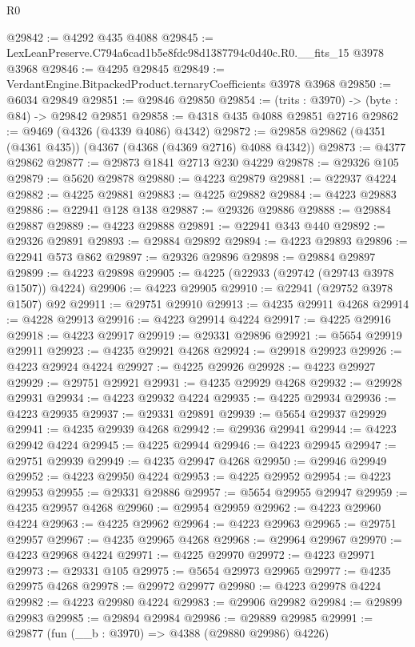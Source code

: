 \begin{lexlean}{R0}
\begin{coremodule}
@29842 := @4292 @435 @4088
@29845 := LexLeanPreserve.C794a6cad1b5e8fdc98d1387794c0d40c.R0.__fits_15 @3978 @3968
@29846 := @4295 @29845
@29849 := VerdantEngine.BitpackedProduct.ternaryCoefficients @3978 @3968
@29850 := @6034 @29849
@29851 := @29846 @29850
@29854 := (trits : @3970) -> (byte : @84) -> @29842 @29851
@29858 := @4318 @435 @4088 @29851 @2716
@29862 := @9469 (@4326 (@4339 @4086) @4342)
@29872 := @29858 @29862 (@4351 (@4361 @435)) (@4367 (@4368 (@4369 @2716) @4088 @4342))
@29873 := @4377 @29862
@29877 := @29873 @1841 @2713 @230 @4229
@29878 := @29326 @105
@29879 := @5620 @29878
@29880 := @4223 @29879
@29881 := @22937 @4224
@29882 := @4225 @29881
@29883 := @4225 @29882
@29884 := @4223 @29883
@29886 := @22941 @128 @138
@29887 := @29326 @29886
@29888 := @29884 @29887
@29889 := @4223 @29888
@29891 := @22941 @343 @440
@29892 := @29326 @29891
@29893 := @29884 @29892
@29894 := @4223 @29893
@29896 := @22941 @573 @862
@29897 := @29326 @29896
@29898 := @29884 @29897
@29899 := @4223 @29898
@29905 := @4225 (@22933 (@29742 (@29743 @3978 @1507)) @4224)
@29906 := @4223 @29905
@29910 := @22941 (@29752 @3978 @1507) @92
@29911 := @29751 @29910
@29913 := @4235 @29911 @4268
@29914 := @4228 @29913
@29916 := @4223 @29914 @4224
@29917 := @4225 @29916
@29918 := @4223 @29917
@29919 := @29331 @29896
@29921 := @5654 @29919 @29911
@29923 := @4235 @29921 @4268
@29924 := @29918 @29923
@29926 := @4223 @29924 @4224
@29927 := @4225 @29926
@29928 := @4223 @29927
@29929 := @29751 @29921
@29931 := @4235 @29929 @4268
@29932 := @29928 @29931
@29934 := @4223 @29932 @4224
@29935 := @4225 @29934
@29936 := @4223 @29935
@29937 := @29331 @29891
@29939 := @5654 @29937 @29929
@29941 := @4235 @29939 @4268
@29942 := @29936 @29941
@29944 := @4223 @29942 @4224
@29945 := @4225 @29944
@29946 := @4223 @29945
@29947 := @29751 @29939
@29949 := @4235 @29947 @4268
@29950 := @29946 @29949
@29952 := @4223 @29950 @4224
@29953 := @4225 @29952
@29954 := @4223 @29953
@29955 := @29331 @29886
@29957 := @5654 @29955 @29947
@29959 := @4235 @29957 @4268
@29960 := @29954 @29959
@29962 := @4223 @29960 @4224
@29963 := @4225 @29962
@29964 := @4223 @29963
@29965 := @29751 @29957
@29967 := @4235 @29965 @4268
@29968 := @29964 @29967
@29970 := @4223 @29968 @4224
@29971 := @4225 @29970
@29972 := @4223 @29971
@29973 := @29331 @105
@29975 := @5654 @29973 @29965
@29977 := @4235 @29975 @4268
@29978 := @29972 @29977
@29980 := @4223 @29978 @4224
@29982 := @4223 @29980 @4224
@29983 := @29906 @29982
@29984 := @29899 @29983
@29985 := @29894 @29984
@29986 := @29889 @29985
@29991 := @29877 (fun (__b : @3970) => @4388 (@29880 @29986) @4226)

\end{coremodule}
\end{lexlean}
